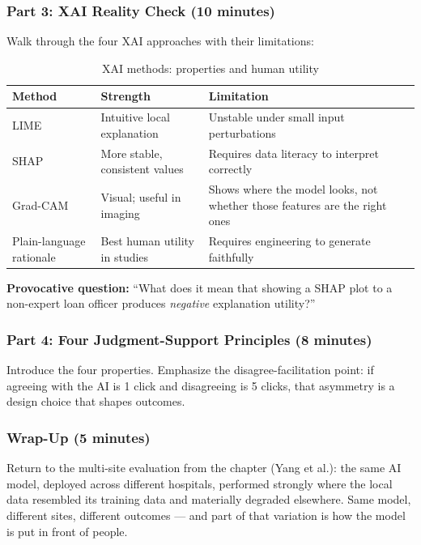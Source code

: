 \subsubsection{Part 3: XAI Reality Check (10 minutes)}

Walk through the four XAI approaches with their limitations:

\begin{table}[htbp]
\caption{XAI methods: properties and human utility}
\label{tab:xai-ch06}
\centering
\begin{tabular}{@{}p{2.5cm}p{4cm}p{4.5cm}@{}}
\toprule
\textbf{Method} & \textbf{Strength} & \textbf{Limitation} \\
\midrule
LIME & Intuitive local explanation & Unstable under small input perturbations \\
SHAP & More stable, consistent values & Requires data literacy to interpret correctly \\
Grad-CAM & Visual; useful in imaging & Shows where the model looks, not whether those features are the right ones \\
Plain-language rationale & Best human utility in studies & Requires engineering to generate faithfully \\
\bottomrule
\end{tabular}
\end{table}

\textbf{Provocative question:} ``What does it mean that showing a SHAP plot to a non-expert loan officer produces \emph{negative} explanation utility?''

\subsubsection{Part 4: Four Judgment-Support Principles (8 minutes)}

Introduce the four properties. Emphasize the disagree-facilitation point: if agreeing with the AI is 1 click and disagreeing is 5 clicks, that asymmetry is a design choice that shapes outcomes.

\subsubsection{Wrap-Up (5 minutes)}

Return to the multi-site evaluation from the chapter (Yang et al.): the same AI model, deployed across different hospitals, performed strongly where the local data resembled its training data and materially degraded elsewhere. Same model, different sites, different outcomes --- and part of that variation is how the model is put in front of people.

